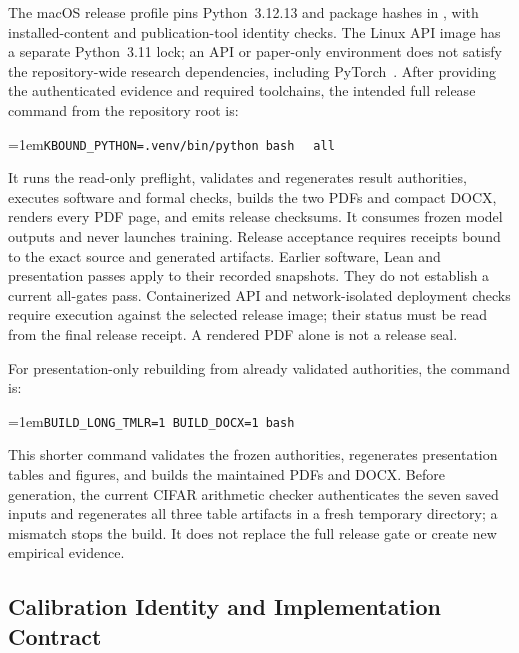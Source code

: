 The macOS release profile pins Python~3.12.13 and package hashes in
, with installed-content and
publication-tool identity checks. The Linux API image has a separate
Python~3.11 lock; an API or paper-only environment does not satisfy the
repository-wide research dependencies, including PyTorch~\cite{paszke2019pytorch}.
After providing the authenticated evidence and required toolchains, the intended
full release command from the repository root is:
\par\vspace{1pt}\noindent\hangindent=1em{\small\texttt{KBOUND\_PYTHON=.venv/bin/python bash }%
\texttt{ all}}\par\vspace{1pt}
It runs the read-only preflight, validates and regenerates result authorities, executes software and
formal checks, builds the two PDFs and compact DOCX, renders every PDF page, and emits release
checksums. It consumes frozen model outputs and never launches training.
Release acceptance requires receipts bound to the exact source and generated artifacts. Earlier software, Lean and presentation passes apply to their recorded snapshots. They do not establish a current all-gates pass. Containerized API and network-isolated deployment checks require execution against the selected release image; their status must be read from the final release receipt. A rendered PDF alone is not a release seal.


For presentation-only rebuilding from already validated authorities, the command is:
\par\vspace{1pt}\noindent\hangindent=1em{\small\texttt{BUILD\_LONG\_TMLR=1 BUILD\_DOCX=1 bash }%
}\par\vspace{1pt}
This shorter command validates the frozen authorities, regenerates presentation tables and figures,
and builds the maintained PDFs and DOCX. Before generation, the current CIFAR
arithmetic checker authenticates the seven saved inputs and regenerates all three
table artifacts in a fresh temporary directory; a mismatch stops the build.
It does not replace the full release gate or create new empirical evidence.

\subsection{Calibration Identity and Implementation Contract}

